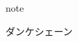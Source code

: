 \documentclass[handout,xcolor=pdftex,dvipsnames,table]{beamer}
\begin{document}
\section*{}
\addtocounter{framenumber}{-1}
\begin{frame}

    \vspace{\fill}
\begin{beamercolorbox}[center,shadow=true,rounded=true]{note} 
  \huge \begin{CJK}{UTF8}{min}ダンケシェーン\end{CJK}
\end{beamercolorbox}

    \vspace{\fill}
\end{frame} 
%
\end{document}
